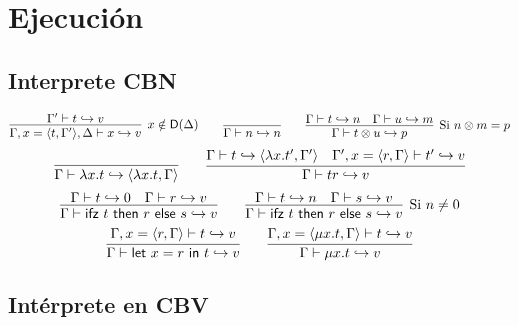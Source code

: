 \documentclass[twoside,a4paper,12pt]{article}
\theoremstyle{definition}
\theoremstyle{remark}
\begin{document}
\newpage
\section*{Ejecución}

\subsection*{Interprete CBN}

\begin{equation*}
  \infer[x\notin\mathsf D(\Delta)]
    {\Gamma,x=\thunk t{\Gamma'},\Delta\vdash x\hra v}
    {\Gamma'\vdash t\hra v} \qquad \infer{\Gamma\vdash n\hra n}{}
  \qquad
  \infer[\textrm{Si }n\otimes m=p]
    {\Gamma\vdash t\otimes u\hra p}
    {\Gamma\vdash t\hra n & \Gamma\vdash u\hra m }
\end{equation*}
\begin{equation*}
  \infer
    {\Gamma\vdash\fun xt\hra\thunk {\fun xt}\Gamma}{}
  \qquad
    \infer{\Gamma\vdash tr\hra v}
    {
      \Gamma\vdash t\hra\thunk {\fun x{t'}}{\Gamma'}
      & \Gamma',x=\thunk r\Gamma\vdash t'\hra v
    }
\end{equation*}
\begin{equation*}
  \infer
    {\Gamma\vdash \ifz trs\hra v}
    {\Gamma\vdash t\hra 0 & \Gamma\vdash r\hra v}
  \qquad
  \infer[\textrm{Si }n\neq 0]
    {\Gamma\vdash \ifz trs\hra v}
    {\Gamma\vdash t\hra n & \Gamma\vdash s\hra v}
\end{equation*}
\begin{equation*}
  \infer
    {\Gamma\vdash\letl xrt\hra v}
    {\Gamma,x=\thunk r\Gamma\vdash t\hra v}
  \qquad
    \infer{\Gamma\vdash\fix xt\hra v}
    {\Gamma,x=\thunk{\fix xt}\Gamma\vdash t\hra v}
\end{equation*}

\subsection*{Intérprete en CBV}
\end{document}
